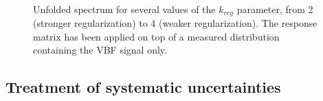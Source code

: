 \begin{figure}[htb]
\centering
{}
\\
\caption{Unfolded spectrum for several values of the $k_{reg}$ parameter, from 2 (stronger regularization) to 4 (weaker regularization). The response matrix has been applied on top of a measured distribution containing the VBF signal only.}
\label{fig:VBF_test}
\end{figure}



\subsection{Treatment of systematic uncertainties}



